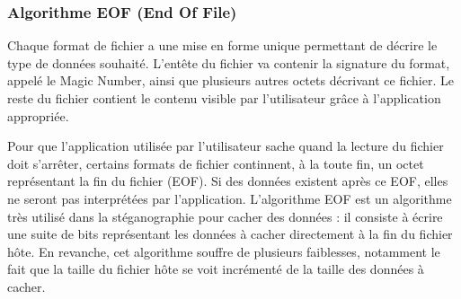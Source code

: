 \documentclass[11pt]{article}
\begin{document}

\subsubsection{Algorithme EOF (End Of File)}

Chaque format de fichier a une mise en forme unique permettant de décrire le
type de données souhaité. L'entête du fichier va contenir la signature du
format, appelé le Magic Number, ainsi que plusieurs autres octets décrivant ce
fichier. Le reste du fichier contient le contenu visible par l'utilisateur grâce
à l'application appropriée. 

Pour que l'application utilisée par l'utilisateur sache quand la lecture du
fichier doit s'arrêter, certains formats de fichier continnent, à la toute fin,
un octet représentant la fin du fichier (EOF). Si des données existent après ce
EOF, elles ne seront pas interprétées par l'application. L'algorithme EOF est un
algorithme très utilisé dans la stéganographie pour cacher des données : il
consiste à écrire une suite de bits représentant les données à cacher
directement à la fin du fichier hôte.
En revanche, cet algorithme souffre de plusieurs faiblesses, notamment 
le fait que la taille du fichier hôte se voit incrémenté de la taille 
des données à cacher.
\end{document}
